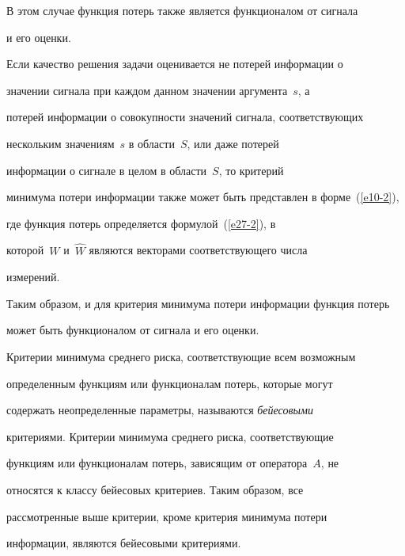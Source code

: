 В этом случае функция потерь также является функционалом от сигнала


и его оценки.





 Если качество решения задачи оценивается не потерей информации о


 значении сигнала при каждом данном значении аргумента~$s$, а


 потерей информации о совокупности значений сигнала, соответствующих


 нескольким значениям~$s$ в области~$S$, или даже потерей


 информации о сигнале в целом в области~$S$, то критерий


 минимума потери информации также может быть представлен в форме~(\ref{e10-2}), 


 где функция потерь определяется формулой~(\ref{e27-2}), в


 которой~$W$ и~$\hat W$ являются векторами соответствующего чис\-ла


 измерений. %






Таким  образом, и для  критерия минимума потери информации функция потерь


 может быть функционалом от сигнала и его оценки.





Критерии минимума среднего риска, соответствующие всем возможным


определенным функциям или функционалам потерь, которые могут


содержать неопределенные параметры, называются \textit{бейесовыми}


критериями. Критерии минимума среднего риска, соответствующие


функциям или функционалам потерь, зависящим от оператора~$A$, не


относятся к классу бейесовых критериев. Таким образом, все


рассмотренные выше критерии, кроме критерия минимума потери


информации, являются бейесовыми критериями.





